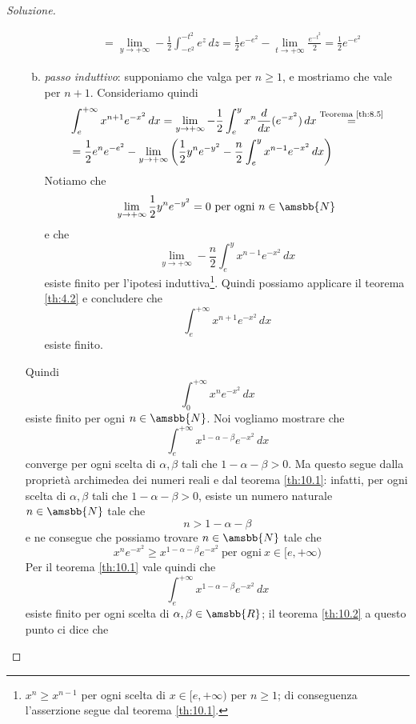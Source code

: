 \begin{proof}[Soluzione]
\begin{enumerate}[(i)]
\begin{enumerate}[(a)]
\[\begin{split}
                & = \lim_{y\to+\infty} -\frac{1}{2}\int_{-e^2}^{-t^2} e^z\, dz = \frac{1}{2}e^{-e^2} - \lim_{t\to +\infty} \frac{e^{-t^2}}{2} = \frac{1}{2}e^{-e^{2}}
            \end{split} 
            \]
            \item \emph{passo induttivo}: supponiamo che valga per $n\ge 1$, e mostriamo che vale per $n+1$. Consideriamo quindi
            \[
            \begin{split}
                & \int_e^{+\infty} x^{n+1}e^{-x^2}\, dx = \lim_{y\to +\infty} -\frac{1}{2} \int_e^y x^n \frac{d}{dx}(e^{-x^2})\, dx \overset{\text{Teorema \ref{th:8.5}}}{=} \\
                & = \frac{1}{2}e^n e^{-e^2}-\lim_{y\to +\infty}\left(\frac{1}{2}y^ne^{-y^2}-\frac{n}{2}\int_e^{y} x^{n-1} e^{-x^2}\, dx\right)
            \end{split} 
            \]
            Notiamo che 
            \[
            \lim_{y\to+\infty} \frac{1}{2}y^n e^{-y^2} = 0 \ \text{per ogni} \ n\in\amsbb{N}
            \]
            e che
            \[
            \lim_{y\to+\infty}-\frac{n}{2}\int_e^y x^{n-1}e^{-x^2}\, dx  
            \]
            esiste finito per l'ipotesi induttiva\footnote{$x^n\ge x^{n-1}$ per ogni scelta di $x\in[e,+\infty)$ per $n\ge 1$; di conseguenza l'asserzione segue dal teorema \ref{th:10.1}.}. Quindi possiamo applicare il teorema \ref{th:4.2} e concludere che
            \[
            \int_e^{+\infty} x^{n+1} e^{-x^2}\, dx
            \]
            esiste finito.
        \end{enumerate}
        Quindi 
        \[
        \int_0^{+\infty} x^n e^{-x^2}\, dx 
        \]
        esiste finito per ogni $n\in\amsbb{N}$. Noi vogliamo mostrare che
        \[
        \int_e^{+\infty} x^{1-\alpha-\beta} e^{-x^2}\, dx
        \]
        converge per ogni scelta di $\alpha, \beta$ tali che $1-\alpha-\beta >0$. Ma questo segue dalla proprietà archimedea dei numeri reali e dal teorema \ref{th:10.1}: infatti, per ogni scelta di $\alpha,\beta$ tali che $1-\alpha-\beta>0$, esiste un numero naturale $n\in\amsbb{N}$ tale che
        \[
        n>1-\alpha-\beta
        \]
        e ne consegue che possiamo trovare $n\in\amsbb{N}$ tale che
        \[
        x^n e^{-x^2}\ge x^{1-\alpha-\beta} e^{-x^2} \ \text{per ogni} \ x\in[e,+\infty)
        \]
        Per il teorema \ref{th:10.1} vale quindi che
        \[
        \int_e^{+\infty} x^{1-\alpha-\beta} e^{-x^2}\, dx
        \]
        esiste finito per ogni scelta di $\alpha, \beta\in\amsbb{R}$; il teorema \ref{th:10.2} a questo punto ci dice che 

\end{enumerate}
\end{proof}
